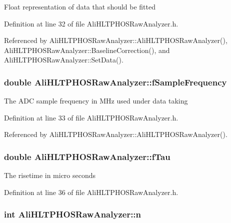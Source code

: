 Float representation of data that should be fitted 

Definition at line 32 of file Ali\-HLTPHOSRaw\-Analyzer.h.

Referenced by Ali\-HLTPHOSRaw\-Analyzer::Ali\-HLTPHOSRaw\-Analyzer(), Ali\-HLTPHOSRaw\-Analyzer::Baseline\-Correction(), and Ali\-HLTPHOSRaw\-Analyzer::Set\-Data().
\subsubsection{\setlength{\rightskip}{0pt plus 5cm}double {\bf Ali\-HLTPHOSRaw\-Analyzer::f\-Sample\-Frequency}\hspace{0.3cm}{\tt  [protected, inherited]}}\label{classAliHLTPHOSRawAnalyzer_AliHLTPHOSRawAnalyzerPeakFinderp1}


The ADC sample frequency in MHz used under data taking 

Definition at line 33 of file Ali\-HLTPHOSRaw\-Analyzer.h.

Referenced by Ali\-HLTPHOSRaw\-Analyzer::Ali\-HLTPHOSRaw\-Analyzer().
\subsubsection{\setlength{\rightskip}{0pt plus 5cm}double {\bf Ali\-HLTPHOSRaw\-Analyzer::f\-Tau}\hspace{0.3cm}{\tt  [protected, inherited]}}\label{classAliHLTPHOSRawAnalyzer_AliHLTPHOSRawAnalyzerPeakFinderp4}


The risetime in micro seconds 

Definition at line 36 of file Ali\-HLTPHOSRaw\-Analyzer.h.
\subsubsection{\setlength{\rightskip}{0pt plus 5cm}int {\bf Ali\-HLTPHOSRaw\-Analyzer::n}\hspace{0.3cm}{\tt  [protected, inherited]}}\label{classAliHLTPHOSRawAnalyzer_AliHLTPHOSRawAnalyzerPeakFinderp7}




